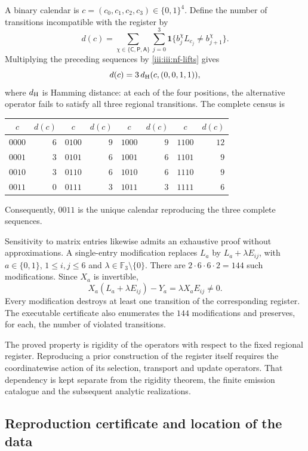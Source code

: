 A binary calendar is $c=(c_0,c_1,c_2,c_3)\in\{0,1\}^4$.
Define the number of transitions incompatible with the register by
\begin{equation}
 d(c)=\sum_{\chi\in\{\mathsf C,\mathsf P,\mathsf A\}}
       \sum_{j=0}^{3}
       \mathbf1\{b_j^\chi L_{c_j}\ne b_{j+1}^\chi\}.
 \label{iii:iii:nf-calendario}
\end{equation}
Multiplying the preceding sequences by
\eqref{iii:iii:nf-lifts} gives
\[
 d(c)=3\,d_{\rm H}(c,(0,0,1,1)),
\]
where $d_{\rm H}$ is Hamming distance: at each of the
four positions, the alternative operator fails to satisfy all three
regional transitions. The complete census is
\begin{center}
\begin{tabular}{cr@{\qquad}cr@{\qquad}cr@{\qquad}cr}
$c$&$d(c)$&$c$&$d(c)$&$c$&$d(c)$&$c$&$d(c)$\\ \hline
$0000$&$6$&$0100$&$9$&$1000$&$9$&$1100$&$12$\\
$0001$&$3$&$0101$&$6$&$1001$&$6$&$1101$&$9$\\
$0010$&$3$&$0110$&$6$&$1010$&$6$&$1110$&$9$\\
$0011$&$0$&$0111$&$3$&$1011$&$3$&$1111$&$6$
\end{tabular}
\end{center}
Consequently, $0011$ is the unique calendar reproducing the
three complete sequences.

Sensitivity to matrix entries likewise admits an
exhaustive proof without approximations. A single-entry modification
replaces $L_a$ by $L_a+\lambda E_{ij}$, with
$a\in\{0,1\}$, $1\le i,j\le6$ and
$\lambda\in\mathbb F_3\setminus\{0\}$. There are
$2\cdot6\cdot6\cdot2=144$ such modifications. Since
$X_a$ is invertible,
\[
 X_a(L_a+\lambda E_{ij})-Y_a
 =\lambda X_aE_{ij}\ne0.
\]
Every modification destroys at least one transition of the
corresponding register. The executable certificate also enumerates
the $144$ modifications and preserves, for each, the number of
violated transitions.

The proved property is rigidity of the operators with respect to the
fixed regional register. Reproducing a prior construction
of the register itself requires the coordinatewise action of its selection,
transport and update operators. That dependency is kept
separate from the rigidity theorem, the finite emission catalogue and
the subsequent analytic realizations.

\subsection{Reproduction certificate and location of the data}

